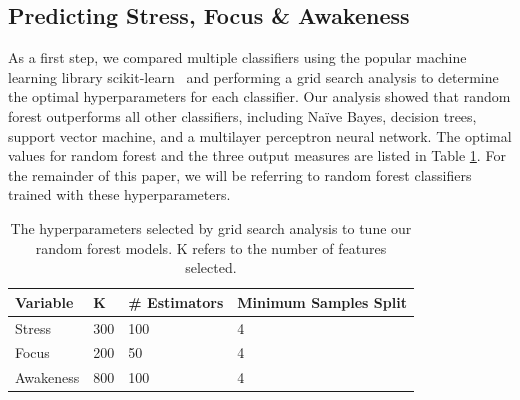 \subsection{Predicting Stress, Focus \& Awakeness}
\label{secOverallAccuracy}
As a first step, we compared multiple classifiers using the popular machine learning library scikit-learn~\cite{pedregosa11} and performing a grid search analysis to determine the optimal hyperparameters for each classifier. Our analysis showed that random forest outperforms all other classifiers, including Na\"ive Bayes, decision trees, support vector machine, and a multilayer perceptron neural network. The optimal values for random forest and the three output measures are listed in Table \ref{tab:hyperparams}. For the remainder of this paper, we will be referring to random forest classifiers trained with these hyperparameters.%
\begin{table}[h]
	\begin{centering}
	\small\addtolength{\tabcolsep}{-1pt}
    \begin{tabular}{llll}
      \hline
      Variable & K & \# Estimators & Minimum Samples Split \\
      \hline
      Stress & 300 & 100 & 4\\
      Focus & 200 & 50 & 4\\
      Awakeness & 800 & 100 & 4\\
      \hline
    \end{tabular}
    \caption{The hyperparameters selected by grid search analysis to tune our random forest models. K refers to the number of features selected.}    \label{tab:hyperparams}
    \end{centering}
\end{table}



